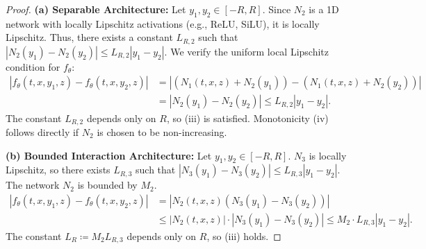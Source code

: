 \documentclass[qian]{imsart}
\newcommand{\abs}[1]{\left\lvert#1\right\rvert}
\theoremstyle{plain}
\theoremstyle{definition}
\begin{document}
\begin{proof}
\textbf{(a) Separable Architecture:} Let $y_1, y_2 \in [-R,R]$. Since $N_2$ is a 1D network with locally Lipschitz activations (e.g., ReLU, SiLU), it is locally Lipschitz. Thus, there exists a constant $L_{R,2}$ such that $\abs{N_2(y_1)-N_2(y_2)} \le L_{R,2}\abs{y_1-y_2}$. We verify the uniform local Lipschitz condition for $f_\theta$:
\begin{align*}
    \abs{f_\theta(t,x,y_1,z) - f_\theta(t,x,y_2,z)} &= \abs{(N_1(t,x,z) + N_2(y_1)) - (N_1(t,x,z) + N_2(y_2))} \\
    &= \abs{N_2(y_1) - N_2(y_2)} \le L_{R,2}\abs{y_1-y_2}.
\end{align*}
The constant $L_{R,2}$ depends only on $R$, so (iii) is satisfied. Monotonicity (iv) follows directly if $N_2$ is chosen to be non-increasing.

\textbf{(b) Bounded Interaction Architecture:} Let $y_1, y_2 \in [-R,R]$. $N_3$ is locally Lipschitz, so there exists $L_{R,3}$ such that $\abs{N_3(y_1)-N_3(y_2)} \le L_{R,3}\abs{y_1-y_2}$. The network $N_2$ is bounded by $M_2$.
\begin{align*}
    \abs{f_\theta(t,x,y_1,z) - f_\theta(t,x,y_2,z)} &= \abs{N_2(t,x,z)(N_3(y_1) - N_3(y_2))} \\
    &\le \abs{N_2(t,x,z)} \cdot \abs{N_3(y_1) - N_3(y_2)} \le M_2 \cdot L_{R,3} \abs{y_1 - y_2}.
\end{align*}
The constant $L_R \coloneqq M_2 L_{R,3}$ depends only on $R$, so (iii) holds.


\end{proof}
\end{document}
